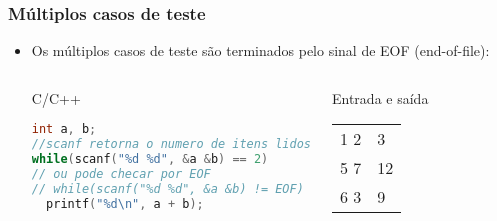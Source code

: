 \begin{frame} [fragile]
  \frametitle{Múltiplos casos de teste}
    \begin{itemize}
      \item {\small Os múltiplos casos de teste são terminados pelo sinal de EOF (end-of-file):}
      \begin{columns}
      \begin{block:ie}{C/C++}
	\begin{lstlisting}[language=c]
int a, b;
//scanf retorna o numero de itens lidos
while(scanf("%d %d", &a &b) == 2)
// ou pode checar por EOF
// while(scanf("%d %d", &a &b) != EOF)
  printf("%d\n", a + b);
	\end{lstlisting}
      \end{block:ie}

      \begin{block:ie}{Entrada e saída}
	\begin{tabularx}{\textwidth}{|X|X|}
	  1 2&3\\5 7&12\\6 3&9
	\end{tabularx}
      \end{block:ie}
    \end{columns}
  \end{itemize}
\end{frame}

